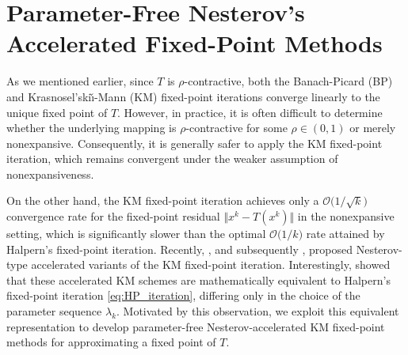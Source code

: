 \documentclass{article}
\theoremstyle{plain}
\theoremstyle{definition}
\newcommand{\norms}[1]{\Vert#1\Vert}
\newcommand{\0}{\boldsymbol{0}}
\newcommand{\BigOs}[1]{\mathcal{O}\big(#1\big)}
\begin{document}
\section{Parameter-Free Nesterov's Accelerated Fixed-Point Methods}\label{sec:NesMethods}
As we mentioned earlier, since $T$ is $\rho$-contractive, both the Banach-Picard (BP) and Krasnosel'ski\v{\i}-Mann (KM) fixed-point iterations converge linearly to the unique fixed point of $T$. 
However, in practice, it is often difficult to determine whether the underlying mapping is $\rho$-contractive for some $\rho \in (0,1)$ or merely nonexpansive. 
Consequently, it is generally safer to apply the KM fixed-point iteration, which remains convergent under the weaker assumption of nonexpansiveness.

On the other hand, the KM fixed-point iteration achieves only a $\BigOs{1/\sqrt{k}}$ convergence rate for the fixed-point residual $\norms{x^k - T(x^k)}$ in the nonexpansive setting, which is significantly slower than the optimal $\BigOs{1/k}$ rate attained by Halpern's fixed-point iteration. 
Recently, \cite{attouch2020convergence}, and subsequently \cite{bot2022bfast}, proposed Nesterov-type accelerated variants of the KM fixed-point iteration. 
Interestingly, \cite{tran2022connection} showed that these accelerated KM schemes are mathematically equivalent to Halpern's fixed-point iteration \eqref{eq:HP_iteration}, differing only in the choice of the parameter sequence $\lambda_k$. 
Motivated by this observation, we exploit this equivalent representation to develop parameter-free Nesterov-accelerated KM fixed-point methods for approximating a fixed point of $T$.

\end{document}
